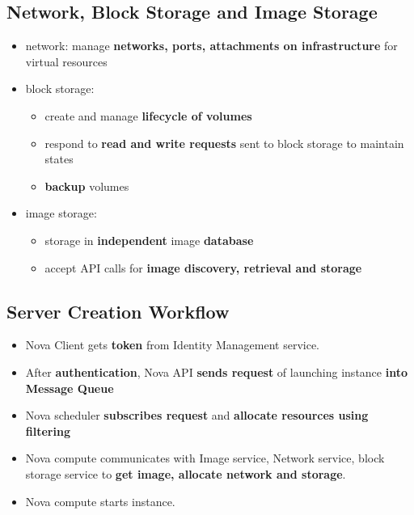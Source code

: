 \subsection{Network, Block Storage and Image Storage}
\begin{itemize}
	\item network: manage \textbf{networks, ports, attachments on infrastructure} for virtual resources
	\item block storage: 
	\begin{itemize}
		\item create and manage \textbf{lifecycle of volumes}
		\item respond to \textbf{read and write requests} sent to block storage to maintain states
		\item \textbf{backup} volumes
	\end{itemize}
	\item image storage:
	\begin{itemize}
		\item storage in \textbf{independent} image \textbf{database}	
		\item accept API calls for \textbf{image discovery, retrieval and storage}
	\end{itemize}
	
\end{itemize}


\subsection{Server Creation Workflow}
\begin{itemize}
	\item Nova Client gets \textbf{token} from Identity Management service.
	\item After \textbf{authentication}, Nova API \textbf{sends request} of launching instance \textbf{into Message Queue}
	\item Nova scheduler \textbf{subscribes request} and \textbf{allocate resources using filtering}
	\item Nova compute communicates with Image service, Network service, block storage service to \textbf{get image, allocate network and storage}.
	\item Nova compute starts instance.
\end{itemize}


